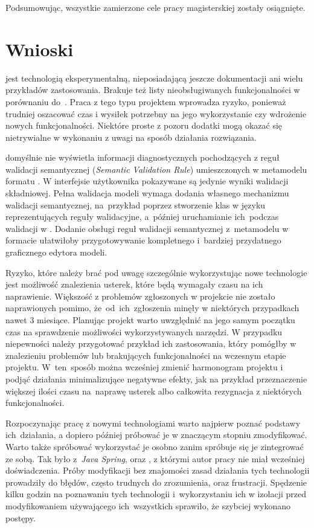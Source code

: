 Podsumowując, wszystkie zamierzone cele pracy magisterskiej zostały osiągnięte.

\section{Wnioski}

\SiriusWeb{} jest technologią eksperymentalną, nieposiadającą jeszcze
dokumentacji ani wielu przykładów zastosowania. Brakuje też listy
nieobsługiwanych funkcjonalności w porównaniu do~\SiriusDesktop{}. Praca z
tego typu projektem wprowadza ryzyko, ponieważ trudniej oszacować czas
i wysiłek potrzebny na jego wykorzystanie czy wdrożenie nowych funkcjonalności.
Niektóre proste z pozoru dodatki mogą okazać się nietrywialne w wykonaniu z
uwagi na sposób działania rozwiązania.

\SiriusWeb{} domyślnie nie wyświetla informacji diagnostycznych pochodzących z
reguł walidacji semantycznej (\emph{Semantic Validation Rule}) umieszczonych w
metamodelu formatu \Ecore{}. W interfejsie użytkownika pokazywane są jedynie
wyniki walidacji składniowej. Pełna walidacja modeli wymaga dodania własnego
mechanizmu walidacji semantycznej, na~przykład poprzez stworzenie klas w języku
\Java{} reprezentujących reguły walidacyjne, a~później uruchamianie ich~podczas
walidacji w \SiriusWeb{}. Dodanie obsługi reguł walidacji semantycznej
z~metamodelu w formacie \Ecore{} ułatwiłoby przygotowywanie kompletnego
i~bardziej przydatnego graficznego edytora modeli.

Ryzyko, które należy brać pod uwagę szczególnie wykorzystując nowe
technologie jest możliwość znalezienia usterek, które będą wymagały czasu na
ich naprawienie. Większość z problemów zgłoszonych w projekcie \SiriusWeb{}
nie zostało naprawionych pomimo, że~od~ich~zgłoszenia minęły w niektórych
przypadkach nawet 3 miesiące. Planując projekt warto uwzględnić na jego samym
początku czas na sprawdzenie możliwości wykorzystywanych narzędzi. W przypadku
niepewności należy przygotować przykład ich zastosowania, który pomógłby w
znalezieniu problemów lub brakujących funkcjonalności na wczesnym etapie
projektu. W~ten~sposób można wcześniej zmienić harmonogram projektu i podjąć
działania minimalizujące negatywne efekty, jak na przykład przeznaczenie
większej ilości czasu na~naprawę usterek albo całkowita rezygnacja z niektórych
funkcjonalności.

Rozpoczynając pracę z nowymi technologiami warto najpierw poznać podstawy
ich~działania, a dopiero później próbować je w znaczącym stopniu zmodyfikować.
Warto także spróbować wykorzystać je osobno zanim spróbuje się je
zintegrować ze sobą. Tak było z~\emph{Java Spring}, \Maven{} oraz
\EMF{}, z którymi autor pracy nie miał wcześniej doświadczenia. Próby
modyfikacji bez znajomości zasad działania tych technologii prowadziły do
błędów, często trudnych do zrozumienia, oraz frustracji. Spędzenie kilku godzin
na poznawaniu tych technologii i~wykorzystaniu ich w izolacji przed
modyfikowaniem \SiriusWeb{} używającego ich~wszystkich sprawiło, że
szybciej wykonano postępy.

